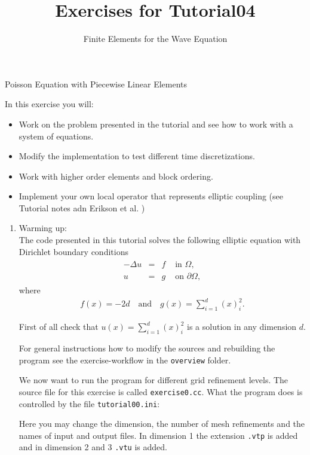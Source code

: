 \documentclass[12pt,a4paper]{article}
\title{\textbf{Exercises for Tutorial04}}
\subtitle{Finite Elements for the Wave  Equation}
\newcommand{\Laplace}{\Delta}
\begin{document}
\exerciseheader

\begin{Exercise}{Poisson Equation with Piecewise Linear Elements}

In this exercise you will:
\begin{itemize}
\item Work on the problem presented in the tutorial and see how to work with a system of equations.
\item Modify the implementation to test different time discretizations. 
\item Work with higher order elements and block ordering.
\item Implement your own local operator that represents elliptic coupling (see Tutorial notes adn Erikson et al. )
\end{itemize}

\begin{enumerate}
\item {\sc Warming up}:\\
  The code presented in this tutorial solves the following elliptic
  equation with Dirichlet boundary conditions
  \begin{align*}
    \begin{array}{rcll}
      -\Laplace u  & = & f & \text{ in } \Omega, \\
      u & = & g & \text{ on } \partial\Omega,
    \end{array}
  \end{align*}
  where
  \begin{align*}
    f(x) = -2d \quad\text{and}\quad  g(x) = \sum_{i=1}^d (x)_i^2.
  \end{align*}

  First of all check that $u(x) = \sum_{i=1}^d (x)_i^2$ is a solution
  in any dimension $d$.

  For general instructions how to modify the sources and rebuilding
  the program see the exercise-workflow in the \lstinline{overview} folder.  
  
  
  We now want to run the program for different grid
  refinement levels.  The source file for this exercise is called
  \lstinline{exercise0.cc}.  What the program does is controlled by
  the file \lstinline{tutorial00.ini}:
  

  Here you may change the dimension, the number of mesh refinements
  and the names of input and output files. In dimension 1 the
  extension \lstinline{.vtp} is added and in dimension 2 and 3
  \lstinline{.vtu} is added.


\end{enumerate}
\end{Exercise}
\end{document}
